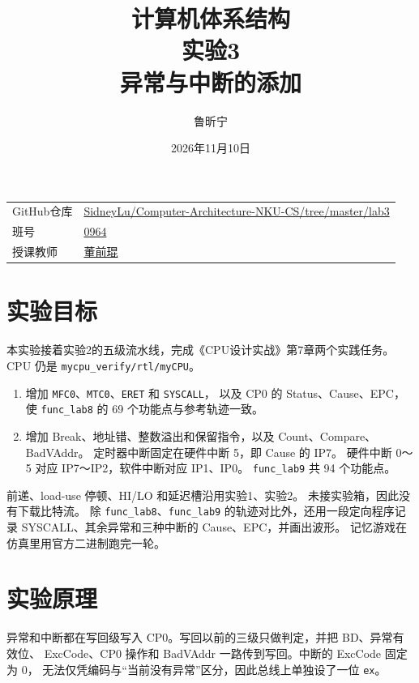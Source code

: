 \documentclass{article}
\title{计算机体系结构\\实验3\\异常与中断的添加}
\author{鲁昕宁 \quad 2414015}
\date{2026年11月10日}
\begin{document}
\maketitle
\begin{center}
\begin{tabular}{ll}
GitHub仓库 & \parbox[t]{0.72\textwidth}{\url{SidneyLu/Computer-Architecture-NKU-CS/tree/master/lab3}} \\[0.6em]
班号 & \underline{0964} \\[0.6em]
授课教师 & \underline{董前琨} \\[0.6em]
\end{tabular}
\end{center}

\newpage

\section{实验目标}
本实验接着实验2的五级流水线，完成《CPU设计实战》第7章两个实践任务。
CPU 仍是 \texttt{mycpu\_verify/rtl/myCPU}。

\begin{enumerate}
  \item 增加 \texttt{MFC0}、\texttt{MTC0}、\texttt{ERET} 和 \texttt{SYSCALL}，
        以及 CP0 的 Status、Cause、EPC，使 \texttt{func\_lab8} 的 69 个功能点与参考轨迹一致。
  \item 增加 Break、地址错、整数溢出和保留指令，以及 Count、Compare、BadVAddr。
        定时器中断固定在硬件中断 5，即 Cause 的 IP7。
        硬件中断 0～5 对应 IP7～IP2，软件中断对应 IP1、IP0。
        \texttt{func\_lab9} 共 94 个功能点。
\end{enumerate}

前递、load-use 停顿、HI/LO 和延迟槽沿用实验1、实验2。
未接实验箱，因此没有下载比特流。
除 \texttt{func\_lab8}、\texttt{func\_lab9} 的轨迹对比外，还用一段定向程序记录
SYSCALL、其余异常和三种中断的 Cause、EPC，并画出波形。
记忆游戏在仿真里用官方二进制跑完一轮。

\section{实验原理}
异常和中断都在写回级写入 CP0。写回以前的三级只做判定，并把 BD、异常有效位、
ExcCode、CP0 操作和 BadVAddr 一路传到写回。中断的 ExcCode 固定为 0，
无法仅凭编码与“当前没有异常”区分，因此总线上单独设了一位 \texttt{ex}。
\end{document}
